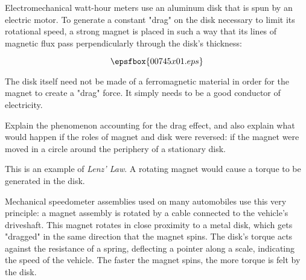 

Electromechanical watt-hour meters use an aluminum disk that is spun by an electric motor.  To generate a constant "drag" on the disk necessary to limit its rotational speed, a strong magnet is placed in such a way that its lines of magnetic flux pass perpendicularly through the disk's thickness:

$$\epsfbox{00745x01.eps}$$

The disk itself need not be made of a ferromagnetic material in order for the magnet to create a "drag" force.  It simply needs to be a good conductor of electricity.

Explain the phenomenon accounting for the drag effect, and also explain what would happen if the roles of magnet and disk were reversed: if the magnet were moved in a circle around the periphery of a stationary disk.







This is an example of {\it Lenz' Law}.  A rotating magnet would cause a torque to be generated in the disk.







Mechanical speedometer assemblies used on many automobiles use this very principle: a magnet assembly is rotated by a cable connected to the vehicle's driveshaft.  This magnet rotates in close proximity to a metal disk, which gets "dragged" in the same direction that the magnet spins.  The disk's torque acts against the resistance of a spring, deflecting a pointer along a scale, indicating the speed of the vehicle.  The faster the magnet spins, the more torque is felt by the disk.





